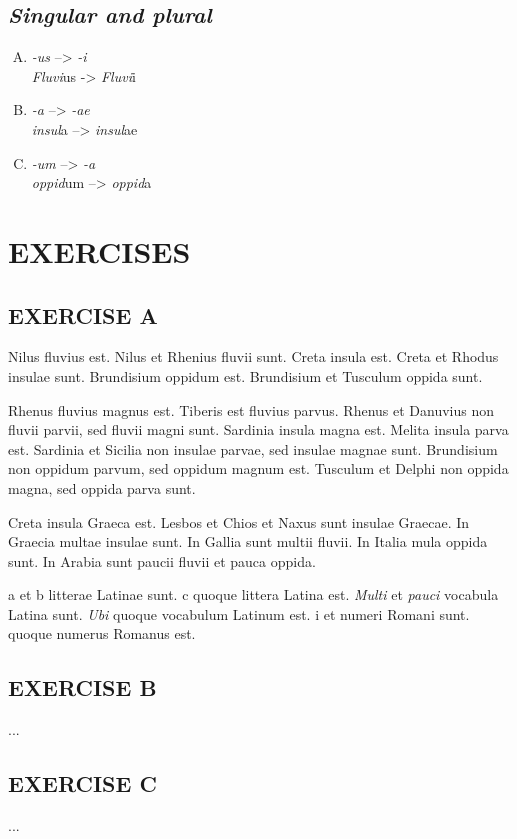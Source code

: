 \subsection{\emph{Singular and plural}}

\begin{enumerate}[(A)]
\item \emph{-us} --> \emph{-i}\\
  \emph{Fluvi}us -> \emph{Fluvi}i
\item \emph{-a} --> \emph{-ae}\\
  \emph{insul}a --> \emph{insul}ae
\item \emph{-um} --> \emph{-a}\\
  \emph{oppid}um --> \emph{oppid}a
\end{enumerate}

\nolinenumbers

\section[Exercises]{EXERCISES}
\subsection*{EXERCISE A}
Nilus fluvius est. Nilus et Rhenius fluvii sunt. Creta insula est. Creta et Rhodus insulae sunt. Brundisium oppidum est. Brundisium et Tusculum oppida sunt.

Rhenus fluvius magnus est. Tiberis est fluvius parvus. Rhenus et Danuvius non fluvii parvii, sed fluvii magni sunt. Sardinia insula magna est. Melita insula parva est. Sardinia et Sicilia non insulae parvae, sed insulae magnae sunt. Brundisium non oppidum parvum, sed oppidum magnum est. Tusculum et Delphi non oppida magna, sed oppida parva sunt.

Creta insula Graeca est. Lesbos et Chios et Naxus sunt insulae Graecae. In Graecia multae insulae sunt. In Gallia sunt multii fluvii. In Italia mula oppida sunt. In Arabia sunt paucii fluvii et pauca oppida.

\smallc a et \smallc b litterae Latinae sunt. \smallc c quoque littera Latina est. \emph{Multi} et \emph{pauci} vocabula Latina sunt. \emph{Ubi} quoque vocabulum Latinum est. \smallc i et  numeri Romani sunt.  quoque numerus Romanus est.

\subsection*{EXERCISE B}
...

\subsection*{EXERCISE C}
...
